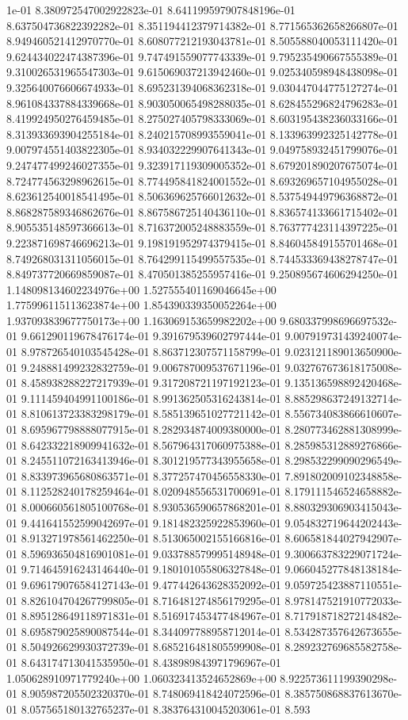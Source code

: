 1e-01	8.380972547002922823e-01	8.641199597907848196e-01	8.637504736822392282e-01	8.351194412379714382e-01	8.771565362658266807e-01	8.949460521412970770e-01	8.608077212193043781e-01	8.505588040053111420e-01	9.624434022474387396e-01	9.747491559077743339e-01	9.795235490667555389e-01	9.310026531965547303e-01	9.615069037213942460e-01	9.025340598948438098e-01	9.325640076606674933e-01	8.695231394068362318e-01	9.030447044775127274e-01	8.961084337884339668e-01	8.903050065498288035e-01	8.628455296824796283e-01	8.419924950276459485e-01	8.275027405798333069e-01	8.603195438236033166e-01	8.313933693904255184e-01	8.240215708993559041e-01	8.133963992325142778e-01	9.007974551403822305e-01	8.934032229907641343e-01	9.049758932451799076e-01	9.247477499246027355e-01	9.323917119309005352e-01	8.679201890207675074e-01	8.724774563298962615e-01	8.774495841824001552e-01	8.693269657104955028e-01	8.623612540018541495e-01	8.506369625766012632e-01	8.537549449796368872e-01	8.868287589346862676e-01	8.867586725140436110e-01	8.836574133661715402e-01	8.905535148597366613e-01	8.716372005248883559e-01	8.763777423114397225e-01	9.223871698746696213e-01	9.198191952974379415e-01	8.846045849155701468e-01	8.749268031311056015e-01	8.764299115499557535e-01	8.744533369438278747e-01	8.849737720669859087e-01	8.470501385255957416e-01	9.250895674606294250e-01	1.148098134602234976e+00	1.527555401169046645e+00	1.775996115113623874e+00	1.854390339350052264e+00	1.937093839677750173e+00	1.163069153659982202e+00	9.680337998696697532e-01	9.661290119678476174e-01	9.391679539602797444e-01	9.007919731439240074e-01	8.978726540103545428e-01	8.863712307571158799e-01	9.023121189013650900e-01	9.248881499232832759e-01	9.006787009537671196e-01	9.032767673618175008e-01	8.458938288227217939e-01	9.317208721197192123e-01	9.135136598892420468e-01	9.111459404991100186e-01	8.991362505316243814e-01	8.885298637249132714e-01	8.810613723383298179e-01	8.585139651027721142e-01	8.556734083866610607e-01	8.695967798888077915e-01	8.282934874009380000e-01	8.280773462881308999e-01	8.642332218909941632e-01	8.567964317060975388e-01	8.285985312889276866e-01	8.245511072163413946e-01	8.301219577343955658e-01	8.298532299090296549e-01	8.833973965680863571e-01	8.377257470456558330e-01	7.891802009102348858e-01	8.112528240178259464e-01	8.020948556531700691e-01	8.179111546524658882e-01	8.000660561805100768e-01	8.930536590657868201e-01	8.880329306903415043e-01	9.441641552599042697e-01	9.181482325922853960e-01	9.054832719644202443e-01	8.913271978561462250e-01	8.513065002155166816e-01	8.606581844027942907e-01	8.596936504816901081e-01	9.033788579995148948e-01	9.300663783229071724e-01	9.714645916243146440e-01	9.180101055806327848e-01	9.066045277848138184e-01	9.696179076584127143e-01	9.477442643628352092e-01	9.059725423887110551e-01	8.826104704267799805e-01	8.716481274856179295e-01	8.978147521910772033e-01	8.895128649118971831e-01	8.516917453477484967e-01	8.717918718272148482e-01	8.695879025890087544e-01	8.344097788958712014e-01	8.534287357642673655e-01	8.504926629930372739e-01	8.685216481805599908e-01	8.289232769685582758e-01	8.643174713041535950e-01	8.438989843971796967e-01	1.050628910971779240e+00	1.060323413524652869e+00	8.922573611199390298e-01	8.905987205502320370e-01	8.748069418424072596e-01	8.385750868837613670e-01	8.057565180132765237e-01	8.383764310045203061e-01	8.593